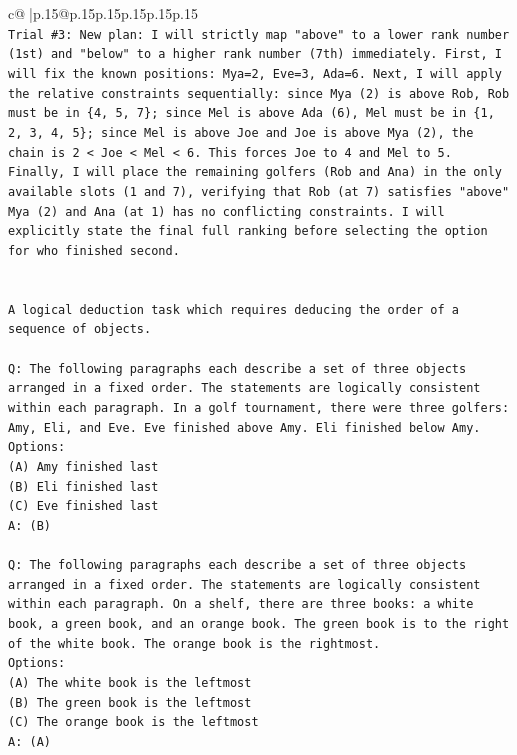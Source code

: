 \documentclass{article}
\begin{document}
{\begin{supertabular}{c@{$\;$}|p{.15\linewidth}@{}p{.15\linewidth}p{.15\linewidth}p{.15\linewidth}p{.15\linewidth}p{.15\linewidth}}
{{{\\ 
\texttt{Trial \#3: New plan: I will strictly map "above" to a lower rank number (1st) and "below" to a higher rank number (7th) immediately. First, I will fix the known positions: Mya=2, Eve=3, Ada=6. Next, I will apply the relative constraints sequentially: since Mya (2) is above Rob, Rob must be in \{4, 5, 7\}; since Mel is above Ada (6), Mel must be in \{1, 2, 3, 4, 5\}; since Mel is above Joe and Joe is above Mya (2), the chain is 2 < Joe < Mel < 6. This forces Joe to 4 and Mel to 5. Finally, I will place the remaining golfers (Rob and Ana) in the only available slots (1 and 7), verifying that Rob (at 7) satisfies "above" Mya (2) and Ana (at 1) has no conflicting constraints. I will explicitly state the final full ranking before selecting the option for who finished second.} \\
\\ 
\\ 
\texttt{A logical deduction task which requires deducing the order of a sequence of objects.} \\
\\ 
\texttt{Q: The following paragraphs each describe a set of three objects arranged in a fixed order. The statements are logically consistent within each paragraph. In a golf tournament, there were three golfers: Amy, Eli, and Eve. Eve finished above Amy. Eli finished below Amy.} \\
\texttt{Options:} \\
\texttt{(A) Amy finished last} \\
\texttt{(B) Eli finished last} \\
\texttt{(C) Eve finished last} \\
\texttt{A: (B)} \\
\\ 
\texttt{Q: The following paragraphs each describe a set of three objects arranged in a fixed order. The statements are logically consistent within each paragraph. On a shelf, there are three books: a white book, a green book, and an orange book. The green book is to the right of the white book. The orange book is the rightmost.} \\
\texttt{Options:} \\
\texttt{(A) The white book is the leftmost} \\
\texttt{(B) The green book is the leftmost} \\
\texttt{(C) The orange book is the leftmost} \\
\texttt{A: (A)} \\
}}}
\end{supertabular}}
\end{document}
